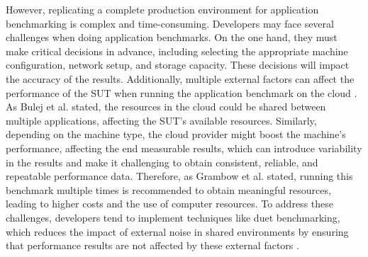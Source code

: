 However, replicating a complete production environment for application benchmarking is complex and time-consuming. Developers may face several challenges when doing application benchmarks. On the one hand, they must make critical decisions in advance, including selecting the appropriate machine configuration, network setup, and storage capacity. These decisions will impact the accuracy of the results. Additionally, multiple external factors can affect the performance of the \ac{SUT} when running the application benchmark on the cloud \cite{denaro2004early}. As Bulej et al. \cite{bulej2019initial} stated, the resources in the cloud could be shared between multiple applications, affecting the \ac{SUT}'s available resources. Similarly, depending on the machine type, the cloud provider might boost the machine's performance, affecting the end measurable results, which can introduce variability in the results and make it challenging to obtain consistent, reliable, and repeatable performance data. Therefore, as Grambow et al. \cite{grambow} stated, running this benchmark multiple times is recommended to obtain meaningful resources, leading to higher costs and the use of computer resources. To address these challenges, developers tend to implement techniques like duet benchmarking, which reduces the impact of external noise in shared environments by ensuring that performance results are not affected by these external factors \cite{bulej2020duet}.

